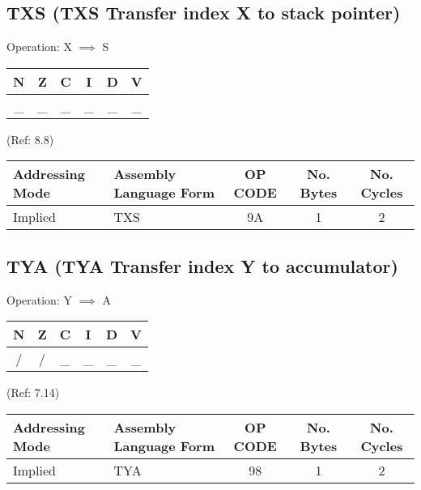 \documentclass{article}
\begin{document}
  \subsection{TXS (TXS Transfer index X to stack pointer)}
  Operation:  X $\implies$ S
  \begin{table}[H]
  \centering
  \begin{tabular}{|c c c c c c|}
  \hline
  N&Z&C&I&D&V\\
  \hline
  \_ & \_ & \_ & \_ & \_ & \_\\
  \hline
  \end{tabular}
  \end{table}
                                 (Ref: 8.8)
  \begin{table}[H]
  \centering
  \begin{tabular}{|l|l|c|c|c|}
  \hline
    Addressing Mode& Assembly Language Form& OP CODE &No. Bytes&No. Cycles\\
  \hline
     Implied       &   TXS                 &    9A   &    1    &    2     \\
  \hline
  \end{tabular}
  \end{table}


  \subsection{TYA (TYA Transfer index Y to accumulator)}
  Operation:  Y $\implies$ A
  \begin{table}[H]
  \centering
  \begin{tabular}{|c c c c c c|}
  \hline
  N&Z&C&I&D&V\\
  \hline
  / & / & \_ & \_ & \_ & \_\\
  \hline
  \end{tabular}
  \end{table}
                                 (Ref: 7.14)
  \begin{table}[H]
  \centering
  \begin{tabular}{|l|l|c|c|c|}
  \hline
    Addressing Mode& Assembly Language Form& OP CODE &No. Bytes&No. Cycles\\
  \hline
     Implied       &   TYA                 &    98   &    1    &    2     \\
  \hline
  \end{tabular}
  \end{table}


\end{document}
